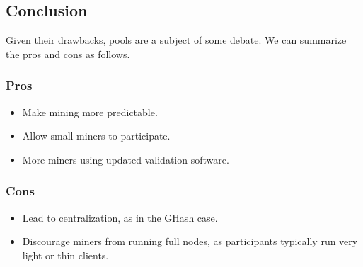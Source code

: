 \documentclass[12pt]{article}
\begin{document}
\subsection*{Conclusion}

Given their drawbacks, pools are a subject of some debate. We can summarize the pros and cons as follows.

\subsubsection*{Pros}
\begin{itemize}
\item Make mining more predictable.
\item Allow small miners to participate.
\item More miners using updated validation software.
\end{itemize}

\subsubsection*{Cons}
\begin{itemize}
\item Lead to centralization, as in the GHash case.
\item Discourage miners from running full nodes, as participants typically run very light or thin clients.
\end{itemize}
\end{document}
